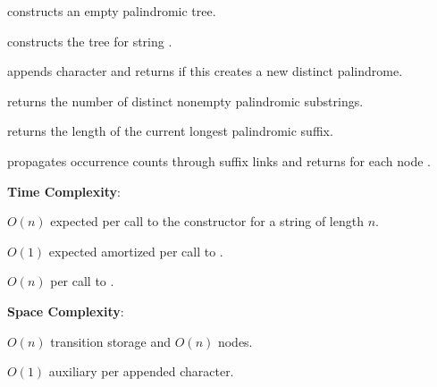 \begin{compactitem}
  \item {} constructs an empty palindromic tree.
  \item {} constructs the tree for string .
  \item {} appends character  and returns  if this creates a new distinct palindrome.
  \item {} returns the number of distinct nonempty palindromic substrings.
  \item {} returns the length of the current longest palindromic suffix.
  \item {} propagates occurrence counts through suffix links and returns  for each node .
\end{compactitem}

\textbf{Time Complexity}:
\begin{compactitem}
  \item $O(n)$ expected per call to the constructor for a string of length $n$.
  \item $O(1)$ expected amortized per call to .
  \item $O(n)$ per call to .
\end{compactitem}

\textbf{Space Complexity}:
\begin{compactitem}
  \item $O(n)$ transition storage and $O(n)$ nodes.
  \item $O(1)$ auxiliary per appended character.
\end{compactitem}

